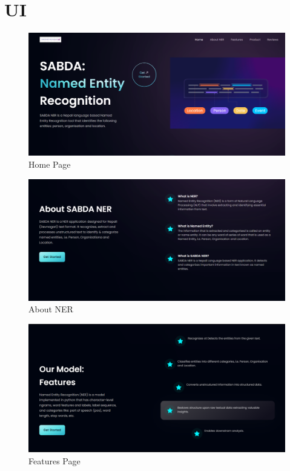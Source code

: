\newpage
\section{UI}
\vspace{20pt}



\begin{figure}[H]
\centering
\includegraphics [scale=0.37]{img/UI/1home.png}
 \caption[Home Page]{Home Page}

\end{figure}

\vspace{30pt}

\begin{figure} [H]
    \centering
    \includegraphics [scale=0.37]{img/UI/2about.PNG}
    \caption [About NER]{About NER}
\end{figure} 

\vspace{30pt}

\begin{figure}[H]
\centering
\includegraphics [scale=0.37]{img/UI/3feature.png}
 \caption[Features Page]{Features Page}
\end{figure}

